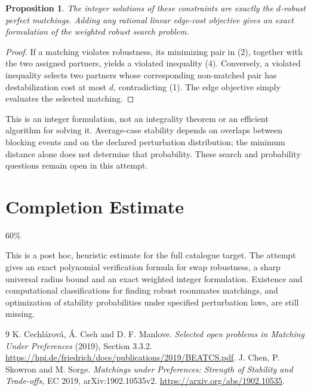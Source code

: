 \documentclass[11pt]{article}
\newtheorem{proposition}[theorem]{Proposition}
\theoremstyle{definition}
\begin{document}
\begin{proposition}
The integer solutions of these constraints are exactly the $d$-robust
perfect matchings. Adding any rational linear edge-cost objective gives
an exact formulation of the weighted robust search problem.
\end{proposition}
\begin{proof}
If a matching violates robustness, its minimizing pair in (2), together
with the two assigned partners, yields a violated inequality (4).
Conversely, a violated inequality selects two partners whose corresponding
non-matched pair has destabilization cost at most $d$, contradicting (1).
The edge objective simply evaluates the selected matching.
\end{proof}
This is an integer formulation, not an integrality theorem or an efficient
algorithm for solving it. Average-case stability depends on overlaps
between blocking events and on the declared perturbation distribution;
the minimum distance alone does not determine that probability. These
search and probability questions remain open in this attempt.

\section{Completion Estimate}
60\%

This is a post hoc, heuristic estimate for the full catalogue target.
The attempt gives an exact polynomial verification formula for swap robustness, a sharp universal radius bound and an exact weighted integer formulation. Existence and computational classifications for finding robust roommates matchings, and optimization of stability probabilities under specified perturbation laws, are still missing.

\begin{thebibliography}{9}
 K. Cechl\'arov\'a, \'A. Cseh and D. F. Manlove.
\emph{Selected open problems in Matching Under Preferences} (2019), Section 3.3.2.
\url{https://hpi.de/friedrich/docs/publications/2019/BEATCS.pdf}.
 J. Chen, P. Skowron and M. Sorge.
\emph{Matchings under Preferences: Strength of Stability and Trade-offs},
EC 2019, arXiv:1902.10535v2.
\url{https://arxiv.org/abs/1902.10535}.
\end{thebibliography}
\end{document}
